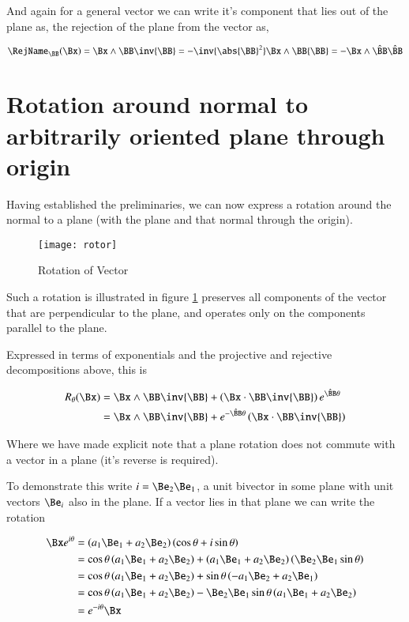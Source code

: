 And again for a general vector we can write it's component that lies out
of the plane as, the rejection of the plane from the vector as,

\[
\RejName_{\BB}(\Bx) 
= \Bx \wedge \BB \inv{\BB}
= -\inv{\abs{\BB}^2} \Bx \wedge \BB {\BB}
= -\Bx \wedge \hat{\BB} \hat{\BB}
\]

\section{Rotation around normal to arbitrarily oriented plane through origin }

Having established the preliminaries, we can now express a rotation around
the normal to a plane (with the plane and that normal through the origin).

\begin{figure}[htp]
\centering
\texttt{[image: rotor]}
\caption{Rotation of Vector}\label{fig:rotor}
\end{figure}

Such a rotation is illustrated in figure \ref{fig:rotor}
preserves all components of the vector that are perpendicular
to the plane, and operates only on the components parallel to the plane.

Expressed in terms of exponentials and the projective and rejective decompositions above, this is

\begin{align*}
R_\theta(\Bx) 
&= \Bx \wedge \BB \inv{\BB} + \left(\Bx \cdot \BB \inv{\BB}\right)e^{\hat{\BB}\theta} \\
&= \Bx \wedge \BB \inv{\BB} + e^{-\hat{\BB}\theta}\left(\Bx \cdot \BB \inv{\BB}\right) \\
\end{align*}

Where we have made explicit note that a plane rotation does not commute with a vector in a plane (it's reverse is required).

To demonstrate this write $i = \Be_2 \Be_1$, a unit bivector in some plane with unit vectors $\Be_i$ also in the plane.  If a vector
lies in that plane we can write the rotation 

\begin{align*}
\Bx e^{i\theta} 
&= \left(a_1\Be_1 + a_2\Be_2\right)\left(\cos\theta + i\sin\theta\right) \\
&= \cos\theta\left(a_1\Be_1 + a_2\Be_2\right) + \left(a_1\Be_1 + a_2\Be_2\right)\left(\Be_2 \Be_1\sin\theta\right) \\
&= \cos\theta\left(a_1\Be_1 + a_2\Be_2\right) + \sin\theta \left(-a_1\Be_2 + a_2\Be_1\right) \\
&= \cos\theta\left(a_1\Be_1 + a_2\Be_2\right) -\Be_2 \Be_1\sin\theta \left(a_1\Be_1 + a_2\Be_2\right) \\
&= e^{-i\theta}\Bx \\
\end{align*}

